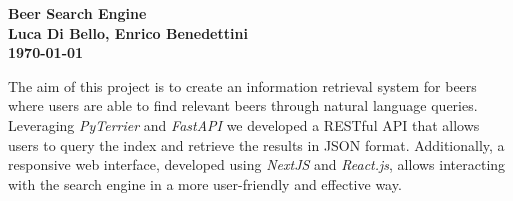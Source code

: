 \documentclass{article}
\begin{document}
\thispagestyle{plain}
\begin{center}
  \Large
  \textbf{Beer Search Engine} \\
  \vspace{0.4cm}
  \textbf{Luca Di Bello, Enrico Benedettini}
  \vspace{0.4cm}
  \textbf{\\ \today}
  \vspace{0.9cm}
\end{center}

\footnotesize

\noindent The aim of this project is to create an information retrieval system for beers where users are able to find relevant beers through natural language queries. Leveraging \textit{PyTerrier} and \textit{FastAPI} we developed a RESTful API that allows users to query the index and retrieve the results in JSON format. Additionally, a responsive web interface, developed using \textit{NextJS} and \textit{React.js}, allows interacting with the search engine in a more user-friendly and effective way.





\end{document}
